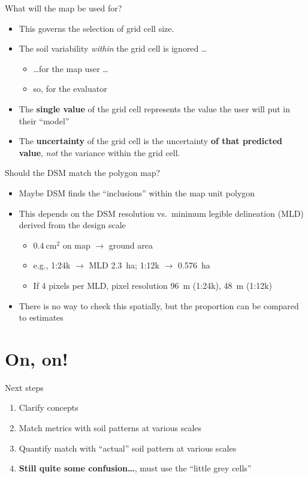 \documentclass[aspectratio=169]{beamer}
\begin{document}
\begin{frame}{What will the map be used for?}
    \begin{itemize}
        \item This governs the selection of grid cell size.
        \item The soil variability \emph{within} the grid cell is ignored \ldots
        \begin{itemize}
            \item \ldots for the map user \ldots
            \item so, for the evaluator
        \end{itemize}
        \item The \textbf{single value} of the grid cell represents the value the user will put in their ``model''
        \item The \textbf{uncertainty} of the grid cell is the uncertainty \textbf{of that predicted value}, \emph{not} the variance within the grid cell.
    \end{itemize}
\end{frame}

\begin{frame}{Should the DSM match the polygon map?}
    \begin{itemize}
        \item Maybe DSM finds the ``inclusions'' within the map unit polygon
        \item This depends on the DSM resolution vs.\ minimum legible delineation (MLD) derived from the design scale
        \begin{itemize}
            \item $0.4~\mathrm{cm}^2$ on map $\to$ ground area
            \item e.g., 1:24k $\to$ MLD 2.3~ha; 1:12k $\to$ 0.576~ha
            \item If 4 pixels per MLD, pixel resolution 96~m (1:24k), 48~m (1:12k)
        \end{itemize}
        \item There is no way to check this spatially, but the proportion can be compared to estimates
    \end{itemize}
\end{frame}
\section{On, on!}

\begin{frame}{Next steps}
\begin{enumerate}
    \item Clarify concepts
    \item Match metrics with soil patterns at various scales
    \item Quantify match with ``actual'' soil pattern at various scales
    \item \textbf{Still quite some confusion\ldots}, must use the ``little grey cells''
\end{enumerate}
\end{frame}
\end{document}

